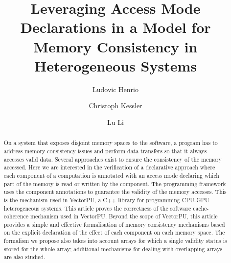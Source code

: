 \documentclass[preprint,12pt]{elsarticle}
\begin{document}
\begin{frontmatter}


\title{Leveraging Access Mode 
Declarations in a Model for Memory Consistency in Heterogeneous Systems }


\author[lip]{Ludovic Henrio}
\author[liu]{Christoph Kessler}
\author[liu]{Lu Li}

\address[lip]{Univ Lyon, CNRS, ENS de Lyon, Inria, Universit\'e Claude Bernard Lyon 1, LIP, Lyon, France.}
\address[liu]{University of Linköping, Sweden}

\begin{abstract}
On a system that exposes disjoint memory spaces to the software, a program has to address memory consistency 
issues and perform data transfers so that it always accesses valid  
data. Several approaches exist to ensure the consistency of the memory accessed. Here we 
are interested in the verification of a declarative approach where each component of 
a computation is annotated with an access mode declaring which part of the memory is 
read or written by the component. The programming framework uses the component
annotations to guarantee the validity of the memory accesses. This is the mechanism used in VectorPU, a C++ library for programming CPU-GPU heterogeneous  systems. 
This article proves the correctness of the software cache-coherence mechanism used in VectorPU. 
Beyond the scope of VectorPU, this article provides a simple and effective formalisation of memory consistency mechanisms based on the explicit declaration of the effect of each component on each memory space. 
The formalism we propose also takes into account arrays for which a single validity status is stored for the whole array; additional mechanisms for dealing with overlapping arrays are also studied. 


\end{abstract}
\end{frontmatter}
\end{document}
